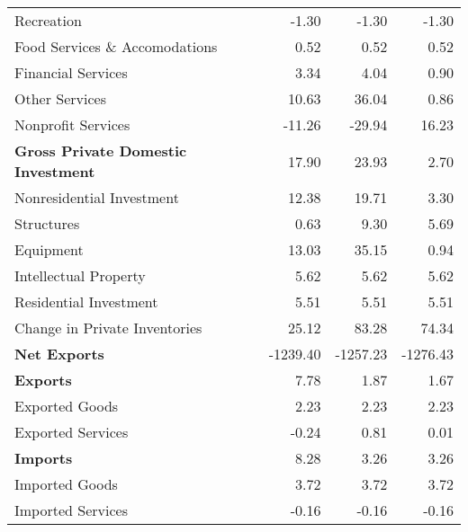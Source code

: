 \documentclass[11pt, letterpaper]{article}\usepackage[]{graphicx}\usepackage[]{color}
\begin{document}
\begin{table}[H]
\begin{tabular}{lrrr}
  \hspace{16mm}  Recreation & -1.30 & -1.30 & -1.30 \\ 
  \hspace{16mm}  Food Services \& Accomodations & 0.52 & 0.52 & 0.52 \\ 
  \hspace{16mm}  Financial Services & 3.34 & 4.04 & 0.90 \\ 
  \hspace{16mm}  Other Services & 10.63 & 36.04 & 0.86 \\ 
  \hspace{16mm}  Nonprofit Services & -11.26 & -29.94 & 16.23 \\ 
  \hspace{0mm} \textbf{Gross Private Domestic Investment} & 17.90 & 23.93 & 2.70 \\ 
  \hspace{8mm}  Nonresidential Investment & 12.38 & 19.71 & 3.30 \\ 
  \hspace{16mm}  Structures & 0.63 & 9.30 & 5.69 \\ 
  \hspace{16mm}  Equipment & 13.03 & 35.15 & 0.94 \\ 
  \hspace{16mm}  Intellectual Property & 5.62 & 5.62 & 5.62 \\ 
  \hspace{8mm}  Residential Investment & 5.51 & 5.51 & 5.51 \\ 
  \hspace{8mm}  Change in Private Inventories & 25.12 & 83.28 & 74.34 \\ 
  \hspace{0mm} \textbf{Net Exports} & -1239.40 & -1257.23 & -1276.43 \\ 
  \hspace{0mm} \textbf{Exports} & 7.78 & 1.87 & 1.67 \\ 
  \hspace{8mm}  Exported Goods & 2.23 & 2.23 & 2.23 \\ 
  \hspace{8mm}  Exported Services & -0.24 & 0.81 & 0.01 \\ 
  \hspace{0mm} \textbf{Imports} & 8.28 & 3.26 & 3.26 \\ 
  \hspace{8mm}  Imported Goods & 3.72 & 3.72 & 3.72 \\ 
  \hspace{8mm}  Imported Services & -0.16 & -0.16 & -0.16 \\ 

\end{tabular}
\end{table}
\end{document}
